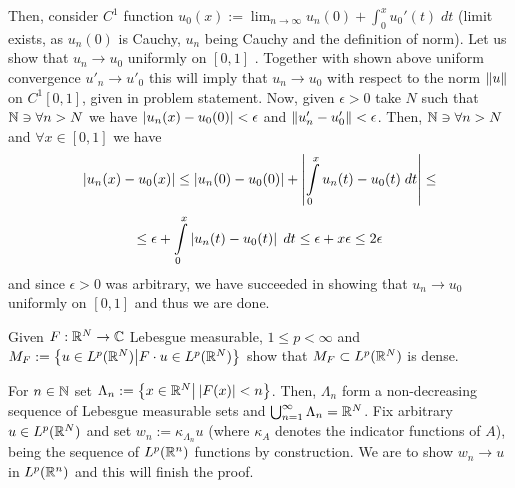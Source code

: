 \documentclass[10pt]{article} %
\begin{document}
Then, consider $C^1$ function $u_0(x):=\lim_{n\to\infty}u_n(0)+\int_0^xu_0'(t)\;dt$ (limit exists, as $u_n(0)$ is Cauchy, $u_n$ being
Cauchy and the definition of norm). Let us show that $u_n\to u_0$ uniformly on $[0,1]$
. Together with shown above uniform convergence
$u'_n\to u'_0$ this will imply that $u_n\to u_0$ with respect to the norm $\|u\|$ on $C^1[0,1]$, given in problem statement.
Now, given $\epsilon>0$ take $N$ such that $\mathbb{N}\ni\forall n>N$ we have $\left|u_n(x)-u_0(0)\right|<\epsilon$ and
$\|u_n'-u'_0\|<\epsilon$. Then, $\mathbb{N}\ni\forall n>N$ and $\forall x\in[0,1]$ we have
\[\myabs{u_n(x)-u_0(x)}\leq\myabs{u_n(0)-u_0(0)}+\myabs{\int_0^xu_n(t)-u_0(t)\;dt}\leq\]
\[\leq\epsilon+\int_0^x\myabs{u_n(t)-u_0(t)}\;dt\leq\epsilon+x\epsilon\leq2\epsilon\]
and since $\epsilon>0$ was arbitrary, we have succeeded in showing that $u_n\to u_0$ uniformly on $[0,1]$ and thus we are done.
\begin{myprob}[Oct 29]Given $F:\mathbb{R}^N\to\mathbb{C}$ Lebesgue measurable, $1\leq p<\infty$ and 
$M_F:=\left\{u\in L^p(\mathbb{R}^N)\big| F\cdot u\in L^p(\mathbb{R}^N)\right\}$ show that $M_F\subset L^p(\mathbb{R}^N)$ is dense.
\end{myprob}
For $n\in\mathbb{N}$ set $\Lambda_n:=\left\{x\in\mathbb{R}^N\big| \left|F(x)\right|<n\right\}$. Then, $\Lambda_n$ form a non-decreasing sequence
of Lebesgue 
measurable sets and $\bigcup_{n=1}^\infty\Lambda_n=\mathbb{R}^N$. Fix arbitrary $u\in L^p(\mathbb{R}^N)$ and set $w_n:=\kappa_{\Lambda_n}u$
(where $\kappa_A$ denotes the indicator functions of $A$), being the sequence of $L^p(\mathbb{R}^n)$ functions by construction.
We are to show $w_n\to u$ in $L^p(\mathbb{R}^n)$ and this will finish the proof.
\end{document}
